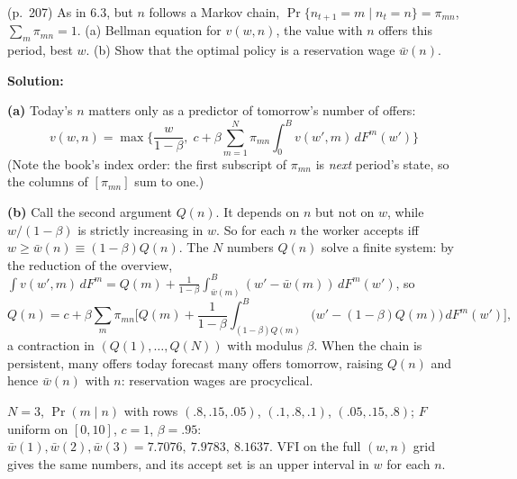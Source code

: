 \documentclass[12pt, letterpaper]{article}
\newcommand{\wb}{\bar w}
\begin{document}
\begin{tcolorbox}[evenbox,title={Exercise 6.4 \quad Cyclical Fluctuations in the Number of Job Offers}]
\begin{tcolorbox}[questionbox]
(p.~207) As in 6.3, but $n$ follows a Markov chain,
$\Pr\{n_{t+1}=m\mid n_t=n\}=\pi_{mn}$, $\sum_m\pi_{mn}=1$. (a) Bellman equation for $v(w,n)$, the value with $n$
offers this period, best $w$. (b) Show that the optimal policy is a reservation wage $\wb(n)$.
\end{tcolorbox}

\textbf{Solution:}

\textbf{(a)} Today's $n$ matters only as a predictor of tomorrow's number of offers:
\[
\boxed{v(w,n)=\max\Big\{\frac{w}{1-\beta},\;c+\beta\sum_{m=1}^N\pi_{mn}\int_0^Bv(w',m)\,dF^m(w')\Big\}}
\]
(Note the book's index order: the first subscript of $\pi_{mn}$ is \emph{next} period's state, so the
columns of $[\pi_{mn}]$ sum to one.)

\textbf{(b)} Call the second argument $Q(n)$. It depends on $n$ but not on $w$, while $w/(1-\beta)$ is strictly
increasing in $w$. So for each $n$ the worker accepts iff $w\ge\wb(n)\equiv(1-\beta)Q(n)$. The $N$ numbers
$Q(n)$ solve a finite system: by the reduction of the overview,
$\int v(w',m)\,dF^m=Q(m)+\frac1{1-\beta}\int_{\wb(m)}^B(w'-\wb(m))\,dF^m(w')$, so
\[
Q(n)=c+\beta\sum_{m}\pi_{mn}\Big[Q(m)+\frac{1}{1-\beta}\int_{(1-\beta)Q(m)}^B\big(w'-(1-\beta)Q(m)\big)\,dF^m(w')\Big],
\]
a contraction in $(Q(1),\dots,Q(N))$ with modulus $\beta$. When the chain is persistent, many offers today
forecast many offers tomorrow, raising $Q(n)$ and hence $\wb(n)$ with $n$: reservation wages are
procyclical.

\begin{tcolorbox}[databox]
$N=3$, $\Pr(m\mid n)$ with rows $(.8,.15,.05)$, $(.1,.8,.1)$, $(.05,.15,.8)$; $F$ uniform on $[0,10]$, $c=1$,
$\beta=.95$: $\wb(1),\wb(2),\wb(3)=7.7076,\ 7.9783,\ 8.1637$. VFI on the full $(w,n)$ grid gives the same numbers,
and its accept set is an upper interval in $w$ for each $n$.
\end{tcolorbox}
\end{tcolorbox}
\end{document}
